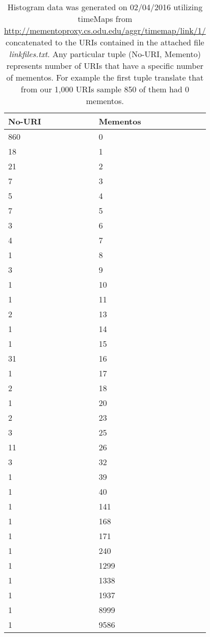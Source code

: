 \newpage
\begin{table}[!htbp]
\caption{Histogram Memento Data for 1000 URIs Extracted from Twitter} \label{tab:table1}

\begin{center}
\begin{tabular}{|l | l|}
\hline
No-URI & Mementos\\
\hline
860 &  0\\
18  &  1\\
21  &  2\\
7   &  3\\
5   &  4\\
7   &  5\\
3   &  6\\
4   &  7\\
1   &  8\\
3   &  9\\
1   & 10\\
1   & 11\\
2   & 13\\
1   & 14\\
1   & 15\\
31  & 16\\
1   & 17\\
2   & 18\\
1   & 20\\
2   & 23\\
3   & 25\\
11  & 26\\
3   & 32\\
1   & 39\\
1   & 40\\
1   & 141\\
1   & 168\\
1   & 171\\
1   & 240\\
1   & 1299\\
1   & 1338\\
1   & 1937\\
1   & 8999\\
1   & 9586\\
\hline
\end{tabular}
\end{center}
\caption*{\scriptsize Histogram data was generated on 02/04/2016 utilizing timeMaps from \url{http://mementoproxy.cs.odu.edu/aggr/timemap/link/1/} concatenated to the URIs contained in the attached file \textit{linkfiles.txt}. Any particular tuple (No-URI, Memento) represents number of URIs that have a specific number of mementos. For example the first tuple translate that from our 1,000 URIs sample 850 of them had 0 mementos. }
\end{table}
